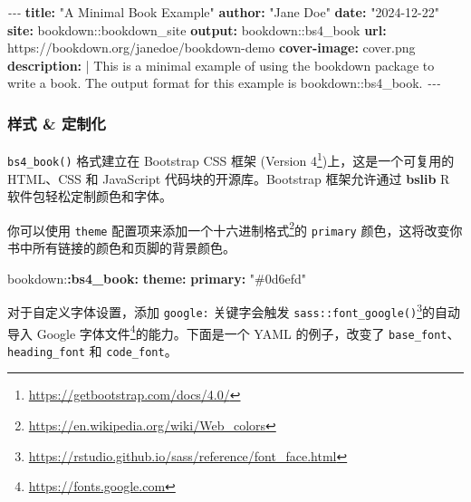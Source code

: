 \documentclass[
  12pt,
]{krantz}
\newenvironment{Shaded}{\begin{snugshade}}{\end{snugshade}}
\newcommand{\AttributeTok}[1]{\textcolor[rgb]{0.13,0.29,0.53}{#1}}
\newcommand{\CharTok}[1]{\textcolor[rgb]{0.31,0.60,0.02}{#1}}
\newcommand{\FunctionTok}[1]{\textcolor[rgb]{0.13,0.29,0.53}{\textbf{#1}}}
\newcommand{\KeywordTok}[1]{\textcolor[rgb]{0.13,0.29,0.53}{\textbf{#1}}}
\newcommand{\NormalTok}[1]{#1}
\newcommand{\PreprocessorTok}[1]{\textcolor[rgb]{0.56,0.35,0.01}{\textit{#1}}}
\newcommand{\StringTok}[1]{\textcolor[rgb]{0.31,0.60,0.02}{#1}}
\renewcommand{\href}[2]{#2\footnote{\url{#1}}}
\theoremstyle{definition}
\theoremstyle{definition}
\theoremstyle{definition}
\theoremstyle{definition}
\theoremstyle{remark}
\begin{document}
\begin{Shaded}
\begin{Highlighting}[]
\PreprocessorTok{{-}{-}{-}}
\FunctionTok{title}\KeywordTok{:}\AttributeTok{ }\StringTok{"A Minimal Book Example"}
\FunctionTok{author}\KeywordTok{:}\AttributeTok{ }\StringTok{"Jane Doe"}
\FunctionTok{date}\KeywordTok{:}\AttributeTok{ }\StringTok{"2024{-}12{-}22"}
\FunctionTok{site}\KeywordTok{:}\AttributeTok{ bookdown::bookdown\_site}
\FunctionTok{output}\KeywordTok{:}\AttributeTok{ bookdown::bs4\_book}
\FunctionTok{url}\KeywordTok{:}\AttributeTok{ https://bookdown.org/janedoe/bookdown{-}demo}
\FunctionTok{cover{-}image}\KeywordTok{:}\AttributeTok{ cover.png}
\FunctionTok{description}\KeywordTok{: }\CharTok{|}
\NormalTok{  This is a minimal example of using the bookdown package to write a book.}
\NormalTok{  The output format for this example is bookdown::bs4\_book.}
\PreprocessorTok{{-}{-}{-}}
\end{Highlighting}
\end{Shaded}

\subsubsection{样式 \& 定制化}\label{ux6837ux5f0f-ux5b9aux5236ux5316}

\texttt{bs4\_book()} 格式建立在 Bootstrap CSS 框架 (\href{https://getbootstrap.com/docs/4.0/}{Version 4})上，这是一个可复用的 HTML、CSS 和 JavaScript 代码块的开源库。Bootstrap 框架允许通过 \textbf{bslib} R 软件包轻松定制颜色和字体。

你可以使用 \texttt{theme} 配置项来添加一个\href{https://en.wikipedia.org/wiki/Web_colors}{十六进制格式}的 \texttt{primary} 颜色，这将改变你书中所有链接的颜色和页脚的背景颜色。

\begin{Shaded}
\begin{Highlighting}[]
\AttributeTok{bookdown:}\FunctionTok{:bs4\_book}\KeywordTok{:}
\AttributeTok{  }\FunctionTok{theme}\KeywordTok{:}
\AttributeTok{    }\FunctionTok{primary}\KeywordTok{:}\AttributeTok{ }\StringTok{"\#0d6efd"}\AttributeTok{   }
\end{Highlighting}
\end{Shaded}

对于自定义字体设置，添加 \texttt{google:} 关键字会触发 \href{https://rstudio.github.io/sass/reference/font_face.html}{\texttt{sass::font\_google()}}的自动导入 \href{https://fonts.google.com}{Google 字体文件}的能力。下面是一个 YAML 的例子，改变了 \texttt{base\_font}、\texttt{heading\_font} 和 \texttt{code\_font}。
\end{document}
